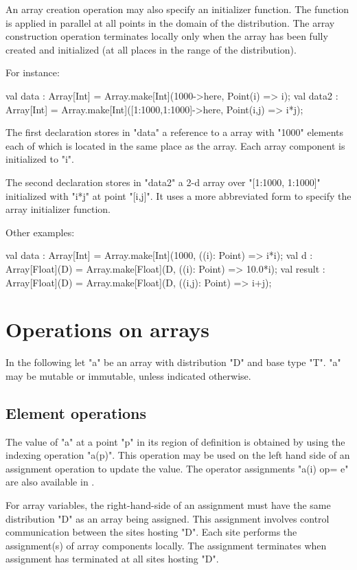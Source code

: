 An array creation operation may also specify an initializer
function.
The function is applied in parallel
at all points in the domain of the distribution. The array
construction operation terminates locally only when the array has been
fully created and initialized (at all places in the range of the
distribution).

For instance:
\begin{xten}
val data : Array[Int]
    = Array.make[Int](1000->here, Point(i) => i);
val data2 : Array[Int]
    = Array.make[Int]([1:1000,1:1000]->here, Point(i,j) => i*j);
\end{xten}

{}\noindent 
The first declaration stores in \xcd"data" a reference to a
array with \xcd"1000" elements each of which is located in the
same place as the array. Each array component is initialized to \xcd"i".

The second declaration stores in \xcd"data2" a
2-d array over \xcd"[1:1000, 1:1000]" initialized with \xcd"i*j"
at point \xcd"[i,j]". It uses a more abbreviated form to specify 
the array initializer function.

Other examples:
\begin{xten}
val data : Array[Int]
    = Array.make[Int](1000, ((i): Point) => i*i);
val d : Array[Float](D)
    = Array.make[Float](D, ((i): Point) => 10.0*i);
val result : Array[Float](D)
    = Array.make[Float](D, ((i,j): Point) => i+j);
\end{xten}

\section{Operations on arrays}
In the following let \xcd"a" be an array with distribution \xcd"D" and
base type \xcd"T". \xcd"a" may be mutable or immutable, unless
indicated otherwise.

\subsection{Element operations}
The value of \xcd"a" at a point \xcd"p" in its region of definition is
obtained by using the indexing operation \xcd"a(p)". This operation
may be used on the left hand side of an assignment operation to update
the value. The operator assignments \xcd"a(i) op= e" are also available
in \Xten{}.

For array variables, the right-hand-side of an assignment must
have the same distribution \xcd"D" as an array being assigned. This
assignment involves
control communication between the sites hosting \xcd"D". Each
site performs the assignment(s) of array components locally. The
assignment terminates when assignment has terminated at all
sites hosting \xcd"D".

